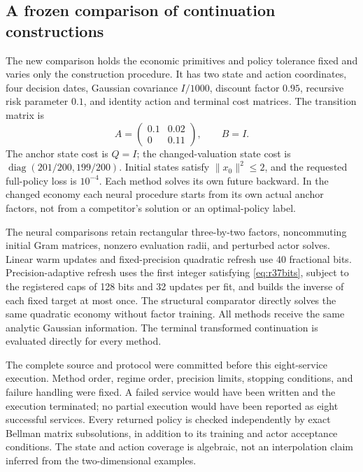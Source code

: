 \documentclass[ecta,nameyear,draft]{econsocart}
\theoremstyle{definition}
\theoremstyle{remark}
\begin{document}
\subsection{A frozen comparison of continuation constructions}
The new comparison holds the economic primitives and policy tolerance fixed
and varies only the construction procedure. It has two state and action
coordinates, four decision dates, Gaussian covariance $I/1000$, discount
factor $0.95$, recursive risk parameter $0.1$, and identity action and terminal
cost matrices. The transition matrix is
\[
 A=\begin{pmatrix}0.1&0.02\\0&0.11\end{pmatrix},\qquad B=I.
\]
The anchor state cost is $Q=I$; the changed-valuation state cost is
$\operatorname{diag}(201/200,199/200)$. Initial states satisfy
$\|x_0\|^2\leq2$, and the requested full-policy loss is $10^{-4}$.
Each method solves its own future backward. In the changed economy each
neural procedure starts from its own actual anchor factors, not from a
competitor's solution or an optimal-policy label.

The neural comparisons retain rectangular three-by-two factors,
noncommuting initial Gram matrices, nonzero evaluation radii, and perturbed
actor solves. Linear warm updates and fixed-precision quadratic refresh use
40 fractional bits. Precision-adaptive refresh uses the first integer
satisfying \eqref{eq:r37bits}, subject to the registered caps of 128 bits and
32 updates per fit, and builds the inverse of each fixed target at most once.
The structural comparator directly solves the same quadratic economy without
factor training. All methods receive the same analytic Gaussian information.
The terminal transformed continuation is evaluated directly for every method.

The complete source and protocol were committed before this eight-service
execution. Method order, regime order, precision limits, stopping conditions,
and failure handling were fixed. A failed service would have been written
and the execution terminated; no partial execution would have been reported
as eight successful services. Every returned policy is checked independently
by exact Bellman matrix subsolutions, in addition to its training and actor
acceptance conditions. The state and action coverage is algebraic, not an
interpolation claim inferred from the two-dimensional examples.
\end{document}
